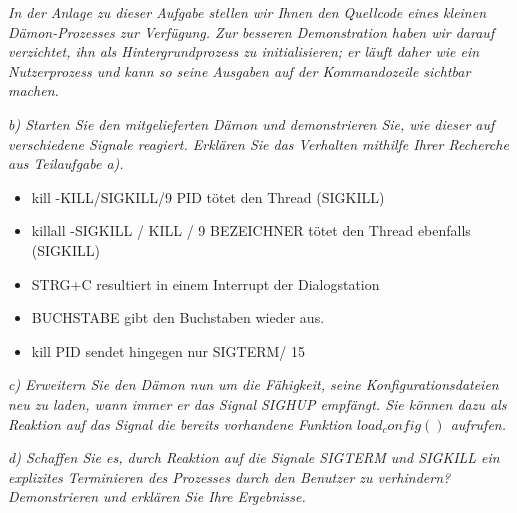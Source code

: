 \documentclass[a4paper]{article}
\begin{document}
\textit{In der Anlage zu dieser Aufgabe stellen wir Ihnen den Quellcode eines kleinen Dämon-Prozesses zur Verfügung. Zur besseren Demonstration haben wir darauf verzichtet, ihn als Hintergrundprozess zu initialisieren; er läuft daher wie ein Nutzerprozess und kann so seine Ausgaben auf der Kommandozeile sichtbar machen.}
\vspace{10mm}

\textit{b) Starten Sie den mitgelieferten Dämon und demonstrieren Sie, wie dieser auf verschiedene Signale reagiert. Erklären Sie das Verhalten mithilfe Ihrer Recherche aus Teilaufgabe a).}
\vspace{10mm}
\begin{itemize}
    \item kill -KILL/SIGKILL/9 PID tötet den Thread (SIGKILL)
    \item killall -SIGKILL / KILL / 9 BEZEICHNER tötet den Thread ebenfalls (SIGKILL)
    \item STRG+C resultiert in einem Interrupt der Dialogstation
    \item BUCHSTABE gibt den Buchstaben wieder aus.
    \item kill PID sendet hingegen nur SIGTERM/ 15
\end{itemize}

\textit{c) Erweitern Sie den Dämon nun um die Fähigkeit, seine Konfigurationsdateien neu zu laden, wann immer er das Signal SIGHUP empfängt. Sie können dazu als Reaktion auf das Signal die bereits vorhandene Funktion $load_config()$ aufrufen.}
\vspace{10mm}

\textit{d) Schaffen Sie es, durch Reaktion auf die Signale SIGTERM und SIGKILL ein explizites Terminieren des Prozesses durch den Benutzer zu verhindern? Demonstrieren und erklären Sie Ihre Ergebnisse.}
\vspace{10mm}


\end{document}
